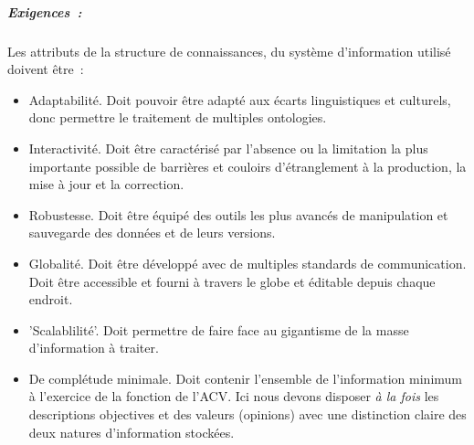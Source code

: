 \subparagraph{Exigences~:}
 
 Les attributs de la structure de connaissances, du système d'information utilisé doivent être~:
 
 \begin{itemize}[noitemsep,topsep=0pt,parsep=0pt,partopsep=0pt]
  \item Adaptabilité. Doit pouvoir être adapté aux écarts linguistiques et culturels, donc permettre le traitement de multiples ontologies.
  \item Interactivité. Doit être caractérisé par l'absence ou la limitation la plus importante possible de barrières et couloirs d'étranglement à la production, la mise à jour et la correction.
  \item Robustesse. Doit être équipé des outils les plus avancés de manipulation et sauvegarde des données et de leurs versions.
  \item Globalité. Doit être développé avec de multiples standards de communication. Doit être accessible et fourni à travers le globe et éditable depuis chaque endroit.
  \item 'Scalablilité'. Doit permettre de faire face au gigantisme de la masse d'information à traiter. %
  \item De complétude minimale. Doit contenir l'ensemble de l'information minimum à l'exercice de la fonction de l'\gls{ACV}.
  Ici nous devons disposer \emph{à la fois} les descriptions objectives et des valeurs (opinions) avec une distinction claire des deux natures d'information stockées.
 \end{itemize}


% 
 
